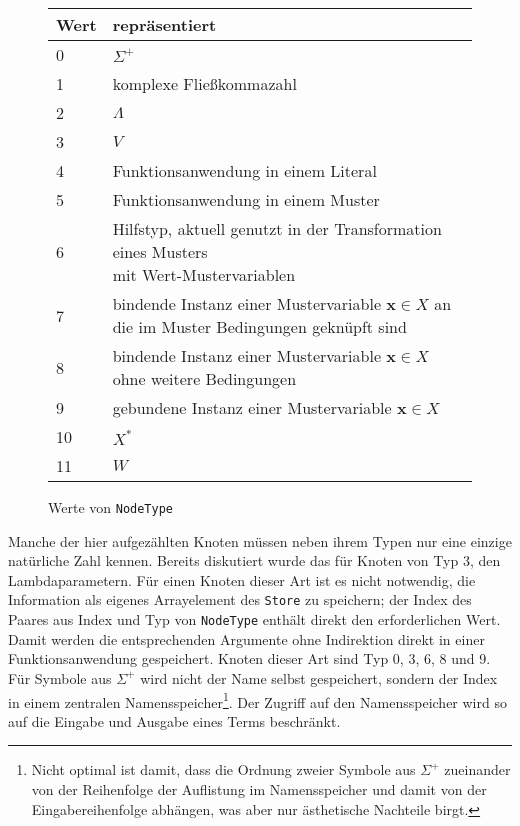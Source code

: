 \begin{figure}
    \centering
    \begin{tabular}{l l}
        \hline
        Wert & repräsentiert\\
        \hline \hline
        0 & $\Sigma^+$\\
        \hline
        1 & komplexe Fließkommazahl\footnotemark\\
        \hline
        2 & $\Lambda$\\
        \hline
        3 & $V$\\
        \hline
        4 & Funktionsanwendung in einem Literal\\
        \hline
        5 & Funktionsanwendung in einem Muster\\
        \hline
        6 & \shortstack[l]{Hilfstyp, aktuell genutzt in der Transformation eines Musters \\ mit Wert-Mustervariablen}\\
        \hline
        7 & \shortstack[l]{bindende Instanz einer Mustervariable $\mathbf x \in X$ an die im Muster \\ Bedingungen geknüpft sind}\\
        \hline
        8 & bindende Instanz einer Mustervariable $\mathbf x \in X$ ohne weitere Bedingungen\\
        \hline
        9 & gebundene Instanz einer Mustervariable $\mathbf x \in X$\\
        \hline
        10 & $X^*$\\
        \hline
        11 & $W$\\
        \hline
    \end{tabular}
    \caption{Werte von \texttt{NodeType}}
    \label{tabNodeType}
\end{figure}
\addtocounter{footnote}{-1}

Manche der hier aufgezählten Knoten müssen neben ihrem Typen nur eine einzige natürliche Zahl kennen. Bereits diskutiert wurde das für Knoten von Typ $3$, den Lambdaparametern. Für einen Knoten dieser Art ist es nicht notwendig, die Information als eigenes Arrayelement des \verb|Store| zu speichern; der Index des Paares aus Index und Typ von \verb|NodeType| enthält direkt den erforderlichen Wert. Damit werden die entsprechenden Argumente ohne Indirektion direkt in einer Funktionsanwendung gespeichert. Knoten dieser Art sind Typ 0, 3, 6, 8 und 9. Für Symbole aus $\Sigma^+$ wird nicht der Name selbst gespeichert, sondern der Index in einem zentralen Namensspeicher\footnote{Nicht optimal ist damit, dass die Ordnung zweier Symbole aus $\Sigma^+$ zueinander von der Reihenfolge der Auflistung im Namensspeicher und damit von der Eingabereihenfolge abhängen, was aber nur ästhetische Nachteile birgt.}. Der Zugriff auf den Namensspeicher wird so auf die Eingabe und Ausgabe eines Terms beschränkt.



